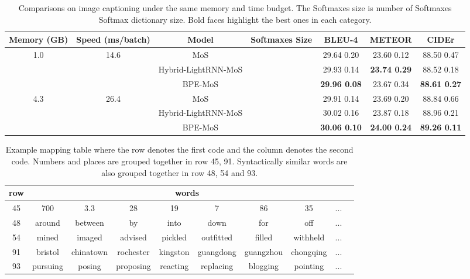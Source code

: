 \documentclass[letterpaper]{article} \usepackage{aaai19}  \usepackage{times}  \usepackage{helvet}  \usepackage{courier}  \usepackage{url}  \usepackage{graphicx}  \frenchspacing  \usepackage{booktabs}
\begin{document}
\begin{table*}[ht]
\centering


\small
  \begin{tabular}{cc|cc|ccc} 
 \toprule
 
Memory (GB) & Speed (ms/batch)&  Model  & Softmaxes Size &  BLEU-4 & METEOR & CIDEr \\  
\midrule
\multirow{3}{*}{1.0} & \multirow{3}{*}{14.6} & MoS &    & 29.64  0.20 & 23.60  0.12 & 88.50  0.47 \\
  &  & Hybrid-LightRNN-MoS   &   & 29.93  0.14 &\textbf{23.74  0.29} & 88.52  0.18  \\
  &  & BPE-MoS  &   & \textbf{29.96  0.08} & 23.67  0.34 & \textbf{88.61  0.27}  \\
 \midrule
\multirow{3}{*}{4.3}& \multirow{3}{*}{26.4} &  MoS  &      & 29.91  0.14 & 23.69  0.20 & 88.84 0.66   \\
  &  &  Hybrid-LightRNN-MoS  &     & 30.02  0.16 & 23.87  0.18 & 88.96  0.21 \\
  &  &  BPE-MoS  &   & \textbf{30.06  0.10} & \textbf{24.00  0.24}  & \textbf{89.26  0.11}  \\
 \bottomrule
\end{tabular}
 \caption{Comparisons on image captioning under the same memory and time budget. The Softmaxes size is number of Softmaxes  Softmax dictionary size.  Bold faces highlight the best ones in each category.}
 \label{tab:ic-results}
\end{table*}

\begin{table*}[ht]
\centering


\small
 \begin{tabular}{c|ccccccccc} 
 \toprule
 row & \multicolumn{8}{c}{words} \\
 \midrule
  45 & 700 & 3.3 & 28 & 19 & 7 & 86 & 35 & ... \\48 & around & between & by & into & down & for & off & ...\\
 54 & mined & imaged & advised & pickled & outfitted & filled & withheld & ...\\
 91 & bristol & chinatown & rochester &  kingston & guangdong & guangzhou & chongqing & ...\\
 93 & pursuing & posing & proposing &reacting & replacing & blogging &pointing & ...\\
  \bottomrule
 \end{tabular}
 \caption{Example mapping table where the row denotes the first code and the column denotes the second code. Numbers and places are grouped together in row 45, 91. Syntactically similar words are also grouped together in row 48, 54 and 93. }
 \label{tab:allo-table}
\end{table*}
\end{document}
